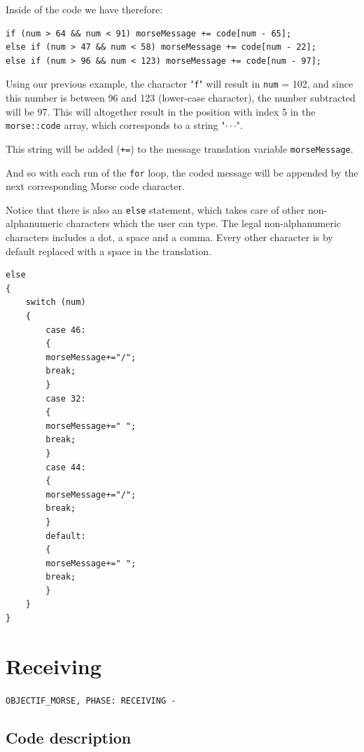 \documentclass[12pt]{report}
\begin{document}
Inside of the code we have therefore:

\begin{snugshade}
\begin{verbatim}
if (num > 64 && num < 91) morseMessage += code[num - 65];
else if (num > 47 && num < 58) morseMessage += code[num - 22];
else if (num > 96 && num < 123) morseMessage += code[num - 97];
\end{verbatim}
\end{snugshade}

Using our previous example, the character "\verb|f|" will result in \verb|num| = 102, and since this number is between 96 and 123 (lower-case character), the number subtracted will be 97. This will altogether result in the position with index 5 in the \verb|morse::code| array, which corresponds to a string "$\cdot\cdot$\text{-}$\cdot$". 

This string will be added (\verb|+=|) to the message translation variable \verb|morseMessage|.

And so with each run of the \verb|for| loop, the coded message will be appended by the next corresponding Morse code character.

Notice that there is also an \verb|else| statement, which takes care of other non-alphanumeric characters which the user can type. The legal non-alphanumeric characters includes a dot, a space and a comma. Every other character is by default replaced with a space in the translation.


\begin{snugshade}
\begin{verbatim}
else
{
	switch (num)
	{
		case 46:
		{
		morseMessage+="/";
		break;
		}
		case 32:
		{
		morseMessage+=" ";
		break;
		}
		case 44:
		{
		morseMessage+="/";
		break;
		}
		default:
		{
		morseMessage+=" ";
		break;
		}
	}
}
\end{verbatim}
\end{snugshade}


\newpage

\chapter{Receiving}

\verb|OBJECTIF_MORSE, PHASE: RECEIVING -|


\section{Code description}
\end{document}
